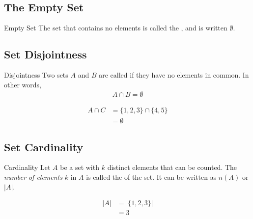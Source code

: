 \documentclass[../notes.tex]{subfiles}
\begin{document}
			\subsection{The Empty Set}
				\begin{definition}{Empty Set}
					The set that contains no elements is called the , and is written $\emptyset$.
				\end{definition}
			\subsection{Set Disjointness}
				\begin{definition}{Disjointness}
					Two sets $A$ and $B$ are called  if they have no elements in common. In other words,
					\begin{align*}
						A \cap B = \emptyset
					\end{align*}
				\end{definition}
				\begin{example} \moveup
					\begin{align*}
						A \cap C &= \{1, 2, 3\} \cap \{4, 5\}\\
						&= \emptyset
					\end{align*}
				\end{example}
			\subsection{Set Cardinality}
				\begin{definition}{Cardinality}
					Let $A$ be a set with $k$ distinct elements that can be counted. The \emph{number of elements} $k$ in $A$ is called the  of the set. It can be written as $n(A)$ or $\left\lvert A\right\rvert$.
				\end{definition}
				\nopagebreak
				\begin{example} \moveup
					\begin{align*}
						\left\lvert A\right\rvert &= \bigl\lvert \{1, 2, 3\}\bigr\rvert\\
						&= 3
					\end{align*}
				\end{example}
\end{document}
